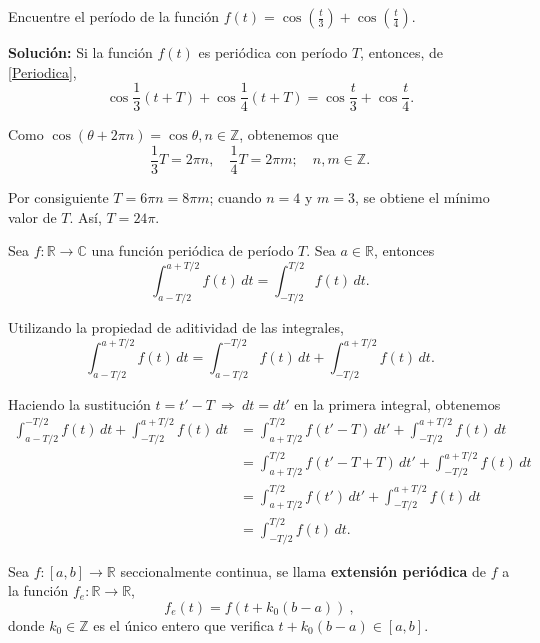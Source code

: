 \begin{ejemplo}
Encuentre el período de la función $f(t) = \cos \left(\frac{t}{3}\right) + \cos \left(\frac{t}{4}\right)$.

\textbf{Solución:} Si la función $f(t)$ es periódica con período $T$, entonces, de \eqref{Periodica},
$$\cos \frac{1}{3}(t + T) + \cos \frac{1}{4}(t + T) = \cos \frac{t}{3} + \cos \frac{t}{4}.$$

Como $\cos(\theta + 2\pi n) = \cos \theta, n \in \mathbb{Z}$, obtenemos que 
$$\frac{1}{3} T = 2\pi n, \quad \frac{1}{4}T = 2\pi m; \quad n,m \in \mathbb{Z}.$$

Por consiguiente $T = 6\pi n = 8\pi m$; cuando $n = 4$ y $m=3$, se obtiene el mínimo valor de $T$. Así, $T = 24\pi$.
\end{ejemplo}



\begin{propo}
Sea $f: \mathbb{R} \longrightarrow \mathbb{C}$ una función periódica de período $T$. Sea $a \in \mathbb{R}$, entonces
$$ \int_{a-T/2}^{a + T/2} f(t) \,dt = \int_{- T/2}^{T/2} f(t) \,dt .$$
\end{propo}

\begin{demo}
Utilizando la propiedad de aditividad de las integrales,
\begin{equation*}
    \int_{a-T/2}^{a + T/2} f(t) \,dt = \int_{a - T/2}^{-T/2} f(t) \,dt + \int_{- T/2}^{a + T/2} f(t) \,dt.
\end{equation*}

Haciendo la sustitución  $t = t' - T ~\Rightarrow~ dt = dt'$ en la primera integral, obtenemos
\begin{align*}
   \int_{a - T/2}^{-T/2}f(t) \,dt + \int_{- T/2}^{a + T/2} f(t) \,dt   &= \int_{a + T/2}^{T/2} f(t'-T) \,dt' + \int_{- T/2}^{a + T/2} f(t) \,dt \\
   &= \int_{a + T/2}^{T/2} f(t'-T + T) \,dt' + \int_{- T/2}^{a + T/2} f(t) \,dt \\
   &= \int_{a + T/2}^{T/2} f(t') \,dt' + \int_{-T/2}^{a + T/2} f(t) \,dt \\
   &= \int_{-T/2}^{T/2} f(t) \,dt.
\end{align*}
\end{demo}

\begin{defi}
Sea $f: [a,b] \rightarrow \mathbb{R}$ seccionalmente continua, se llama \textbf{extensión periódica} de $f$ a la función $f_e: \mathbb{R} \rightarrow \mathbb{R}$,
\begin{equation} 
    \boxed{f_e(t) = f(t + k_0 (b-a))} \ , 
\end{equation}
donde $k_0 \in \mathbb{Z}$ es el único entero que verifica $t + k_0(b-a) \in [a,b].$
\end{defi}


